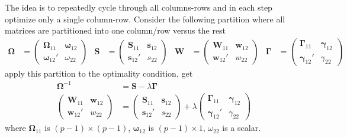 \documentclass[twoside]{article}
\begin{document}
The idea is to repeatedly cycle through all columns-rows and in each step optimize only a single column-row. Consider the following partition where all matrices are partitioned into one column/row versus the rest
\begin{align*}
    \boldsymbol{\Omega} &= \begin{pmatrix}
        \boldsymbol{\Omega}_{11} & \boldsymbol{\omega}_{12}\\
        \boldsymbol{\omega}_{12}' & \omega_{22}
     \end{pmatrix} & \mathbf{S} &= \begin{pmatrix}
        \mathbf{S}_{11} & \mathbf{s}_{12}\\
        \mathbf{s}_{12}' & s_{22}
     \end{pmatrix} & \mathbf{W} &= \begin{pmatrix}
        \mathbf{W}_{11} & \mathbf{w}_{12}\\
        \mathbf{w}_{12}' & w_{22}
     \end{pmatrix} & \boldsymbol{\Gamma} &= \begin{pmatrix}
        \boldsymbol{\Gamma}_{11} & \boldsymbol{\gamma}_{12}\\
        \boldsymbol{\gamma}_{12}' & \gamma_{22}
     \end{pmatrix}
\end{align*}
apply this partition to the optimality condition, get
\begin{align*}
    \boldsymbol{\Omega}^{-1} &= \mathbf{S} - \lambda\boldsymbol{\Gamma} \\
    \begin{pmatrix}
        \mathbf{W}_{11} & \mathbf{w}_{12}\\
        \mathbf{w}_{12}' & w_{22}
    \end{pmatrix} &= \begin{pmatrix}
        \mathbf{S}_{11} & \mathbf{s}_{12}\\
        \mathbf{s}_{12}' & s_{22}
     \end{pmatrix} + \lambda \begin{pmatrix}
        \boldsymbol{\Gamma}_{11} & \boldsymbol{\gamma}_{12}\\
        \boldsymbol{\gamma}_{12}' & \gamma_{22}
     \end{pmatrix}
\end{align*}
where $\boldsymbol{\Omega}_{11}$ is $(p-1)\times(p-1)$, $\boldsymbol{\omega}_{12}$ is $(p-1)\times 1$, $\omega_{22}$ is a scalar.
\end{document}
